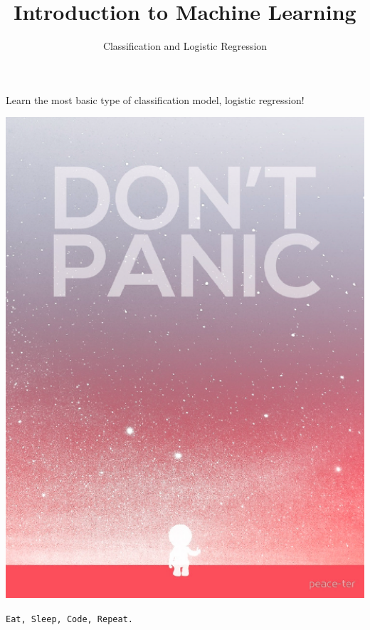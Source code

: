 \documentclass{42-en}
\begin{document}
\title{Introduction to Machine Learning}
\subtitle{Classification and Logistic Regression}


\summary
{
Learn the most basic type of classification model, logistic regression! 
}

\maketitle

\tableofcontents


\newpage

\bigskip

\centerline{\includegraphics[width=150mm]{images/dontpanic.png}}

\centerline{\texttt{Eat, Sleep, Code, Repeat.}}
\end{document}
